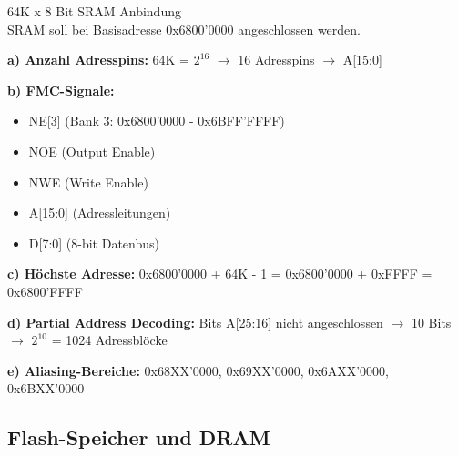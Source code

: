 \begin{example2}{64K x 8 Bit SRAM Anbindung}\\
    SRAM soll bei Basisadresse 0x6800'0000 angeschlossen werden.
    
    \tcblower
    
    \textbf{a) Anzahl Adresspins:}
    64K = $2^{16}$ $\rightarrow$ 16 Adresspins $\rightarrow$ A[15:0]
    
    \textbf{b) FMC-Signale:}
    \begin{itemize}
        \item NE[3] (Bank 3: 0x6800'0000 - 0x6BFF'FFFF)
        \item NOE (Output Enable)
        \item NWE (Write Enable)
        \item A[15:0] (Adressleitungen)
        \item D[7:0] (8-bit Datenbus)
    \end{itemize}
    
    \textbf{c) Höchste Adresse:}
    0x6800'0000 + 64K - 1 = 0x6800'0000 + 0xFFFF = 0x6800'FFFF
    
    \textbf{d) Partial Address Decoding:}
    Bits A[25:16] nicht angeschlossen $\rightarrow$ 10 Bits $\rightarrow$ $2^{10}$ = 1024 Adressblöcke
    
    \textbf{e) Aliasing-Bereiche:}
    0x68XX'0000, 0x69XX'0000, 0x6AXX'0000, 0x6BXX'0000
\end{example2}

\subsection{Flash-Speicher und DRAM}

